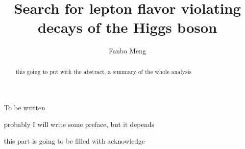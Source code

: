 \documentclass[final,numrefs,sort&compress,twoadvisors]{nddiss2e}
\begin{document}
 
\frontmatter %

\title{Search for lepton flavor violating decays of the Higgs boson}
\author{Fanbo Meng}

\maketitle
%
%

\makecopyright

\begin{abstract}
  this going to put with the abstract, a summary of the whole analysis 
\end{abstract}

\renewcommand{\dedicationname}{NEW DEDICATION NAME}

\begin{dedication}
  To be written
\end{dedication}

\tableofcontents
\listoffigures
\listoftables

\begin{preface}
probably I will write some preface, but it depends   \Hmuhad
\end{preface}

\begin{acknowledge}
 this part is going to be filled with acknowledge
\end{acknowledge}
\end{document}
